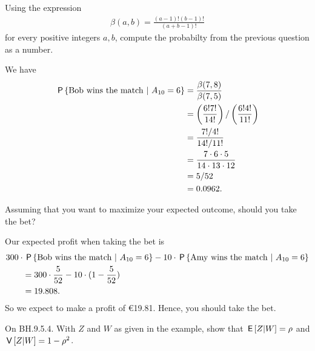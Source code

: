 \begin{exercise}
Using the expression
\begin{align}
    \beta(a,b) = \frac{(a-1)!(b-1)!}{(a+b-1)!}
\end{align}
for every positive integers $a,b$, compute the probabilty from the previous question as a number.
\begin{solution}
We have
\begin{align}
    \P{ \text{Bob wins the match} \ | \ A_{10} = 6 } &= \frac{\beta(7,8)}{\beta(7,5)} \\
    &= \left(\frac{6!7!}{14!}\right)/\left(\frac{6!4!}{11!}\right) \\
    &= \frac{7!/4!}{14!/11!} \\
    &= \frac{7\cdot 6 \cdot 5}{14 \cdot 13 \cdot 12} \\
    &= 5/52 \\
    &= 0.0962.
\end{align}
\end{solution}
\end{exercise}

\begin{exercise}
Assuming that you want to maximize your expected outcome, should you take the bet?
\begin{solution}
Our expected profit when taking the bet is
\begin{align}
    &300 \cdot \P{ \text{Bob wins the match} \ | \ A_{10} = 6 } - 10 \cdot \P{ \text{Amy wins the match} \ | \ A_{10} = 6 } \\
    &\qquad= 300 \cdot \frac{5}{52} - 10 \cdot (1 - \frac{5}{52}) \\
    &\qquad= 19.808.
\end{align}
So we expect to make a profit of €19.81. Hence, you should take the bet.
\end{solution}
\end{exercise}


\begin{exercise}
On BH.9.5.4. With $Z$ and $W$ as given in the example, show that $\E{Z|W} = \rho$ and $\V{Z|W} = 1-\rho^{2}$.
\begin{hint}
\end{hint}
\begin{solution}
\end{solution}
\end{exercise}

